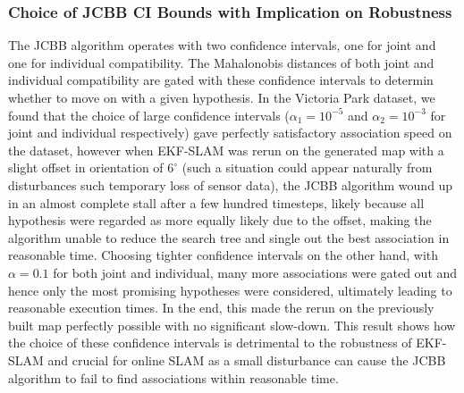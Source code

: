 \subsubsection{Choice of JCBB CI Bounds with Implication on Robustness}
The JCBB algorithm operates with two confidence intervals, one for joint and one for individual compatibility. The Mahalonobis distances of both joint and individual compatibility are gated with these confidence intervals to determin whether to move on with a given hypothesis.\cite{jcbb} In the Victoria Park dataset, we found that the choice of large confidence intervals ($\alpha_1 = 10^{-5}$ and $\alpha_2 = 10^{-3}$ for joint and individual respectively) gave perfectly satisfactory association speed on the dataset, however when EKF-SLAM was rerun on the generated map with a slight offset in orientation of $6^\circ$ (such a situation could appear naturally from disturbances such temporary loss of sensor data), the JCBB algorithm wound up in an almost complete stall after a few hundred timesteps, likely because all hypothesis were regarded as more equally likely due to the offset, making the algorithm unable to reduce the search tree and single out the best association in reasonable time. Choosing tighter confidence intervals on the other hand, with $\alpha = 0.1$ for both joint and individual, many more associations were gated out and hence only the most promising hypotheses were considered, ultimately leading to reasonable execution times. In the end, this made the rerun on the previously built map perfectly possible with no significant slow-down. This result shows how the choice of these confidence intervals is detrimental to the robustness of EKF-SLAM and crucial for online SLAM as a small disturbance can cause the JCBB algorithm to fail to find associations within reasonable time.

